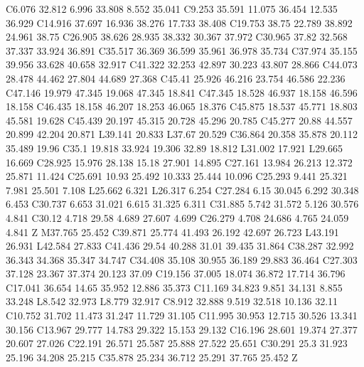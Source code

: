 {\begin{scope}[cm={0.569055,0,0,-0.569055,(-0.5cm,0.388cm)}]
{      C6.076 32.812 6.996 33.808 8.552 35.041 C9.253 35.591 11.075 36.454 12.535 36.929
      C14.916 37.697 16.936 38.276 17.733 38.408 C19.753 38.75 22.789 38.892 24.961 38.75
      C26.905 38.626 28.935 38.332 30.367 37.972 C30.965 37.82 32.568 37.337 33.924 36.891
      C35.517 36.369 36.599 35.961 36.978 35.734 C37.974 35.155 39.956 33.628 40.658 32.917
      C41.322 32.253 42.897 30.223 43.807 28.866 C44.073 28.478 44.462 27.804 44.689 27.368
      C45.41 25.926 46.216 23.754 46.586 22.236 C47.146 19.979 47.345 19.068 47.345 18.841
      C47.345 18.528 46.937 18.158 46.596 18.158 C46.435 18.158 46.207 18.253 46.065 18.376
      C45.875 18.537 45.771 18.803 45.581 19.628 C45.439 20.197 45.315 20.728 45.296 20.785
      C45.277 20.88 44.557 20.899 42.204 20.871 L39.141 20.833 L37.67 20.529
      C36.864 20.358 35.878 20.112 35.489 19.96 C35.1 19.818 33.924 19.306 32.89 18.812
      L31.002 17.921 L29.665 16.669 C28.925 15.976 28.138 15.18 27.901 14.895
      C27.161 13.984 26.213 12.372 25.871 11.424 C25.691 10.93 25.492 10.333 25.444 10.096
      C25.293 9.441 25.321 7.981 25.501 7.108 L25.662 6.321 L26.317 6.254
      C27.284 6.15 30.045 6.292 30.348 6.453 C30.737 6.653 31.021 6.615 31.325 6.311
      C31.885 5.742 31.572 5.126 30.576 4.841 C30.12 4.718 29.58 4.689 27.607 4.699
      C26.279 4.708 24.686 4.765 24.059 4.841 Z M37.765 25.452
      C39.871 25.774 41.493 26.192 42.697 26.723 L43.191 26.931 L42.584 27.833
      C41.436 29.54 40.288 31.01 39.435 31.864 C38.287 32.992 36.343 34.368 35.347 34.747
      C34.408 35.108 30.955 36.189 29.883 36.464 C27.303 37.128 23.367 37.374 20.123 37.09
      C19.156 37.005 18.074 36.872 17.714 36.796 C17.041 36.654 14.65 35.952 12.886 35.373
      C11.169 34.823 9.851 34.131 8.855 33.248 L8.542 32.973 L8.779 32.917
      C8.912 32.888 9.519 32.518 10.136 32.11 C10.752 31.702 11.473 31.247 11.729 31.105
      C11.995 30.953 12.715 30.526 13.341 30.156 C13.967 29.777 14.783 29.322 15.153 29.132
      C16.196 28.601 19.374 27.377 20.607 27.026 C22.191 26.571 25.587 25.888 27.522 25.651
      C30.291 25.3 31.923 25.196 34.208 25.215 C35.878 25.234 36.712 25.291 37.765 25.452 Z
    }
\end{scope}}
